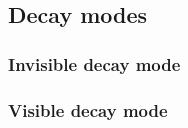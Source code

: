 \subsection{Decay modes}
\label{ch1:sec:dm-decay}

\subsubsection{Invisible decay mode}
\label{ch1:sec:dm-decay-invis}

\subsubsection{Visible decay mode}
\label{ch1:sec:dm-decay-vis}

